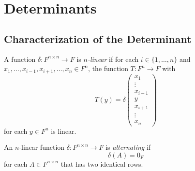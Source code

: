 \chapter{Determinants}
\section{Characterization of the Determinant}
\begin{definition}
  \label{def:multilinear}
  A function $\delta: F^{n \times n} \to F$ is \emph{$n$-linear} if for each
  $i \in \{1, \dots, n\}$ and
  $x_1, \dots, x_{i-1}, x_{i+1}, \dots, x_n \in F^n$,
  the function $T: F^n \to F$ with
  \begin{equation*}
    T(y) = \delta
    \begin{pmatrix}
      x_1 \\
      \vdots \\
      x_{i-1} \\
      y \\
      x_{i+1} \\
      \vdots \\
      x_n
    \end{pmatrix}
  \end{equation*}
  for each $y \in F^n$ is linear.
\end{definition}

\begin{definition}
  An $n$-linear function $\delta: F^{n \times n} \to F$ is \emph{alternating}
  if
  \begin{equation*}
    \delta(A) = 0_F
  \end{equation*}
  for each $A \in F^{n \times n}$ that has two identical rows.
\end{definition}

